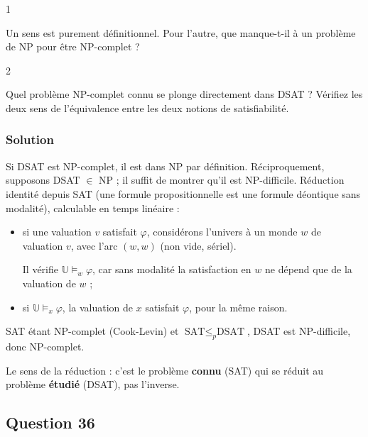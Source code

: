 \documentclass[11pt,a4paper]{article}
\begin{document}
\begin{indication}{1}

Un sens est purement définitionnel. Pour l'autre, que manque-t-il à un problème de NP pour être NP-complet ?

\end{indication}

\begin{indication}{2}

Quel problème NP-complet connu se plonge directement dans DSAT ? Vérifiez les deux sens de l'équivalence entre les deux notions de satisfiabilité.

\end{indication}

\hypertarget{solution-34}{%
\subsubsection{Solution}\label{solution-34}}

Si DSAT est NP-complet, il est dans NP par définition. Réciproquement, supposons DSAT \(\in\) NP ; il suffit de montrer qu'il est NP-difficile. Réduction identité depuis SAT (une formule propositionnelle est une formule déontique sans modalité), calculable en temps linéaire :

\begin{itemize}
\item
  si une valuation \(v\) satisfait \(\varphi\), considérons l'univers à un monde \(w\) de valuation \(v\), avec l'arc \((w,w)\) (non vide, sériel).

  Il vérifie \(\mathbb U\models_w\varphi\), car sans modalité la satisfaction en \(w\) ne dépend que de la valuation de \(w\) ;
\item
  si \(\mathbb U\models_x\varphi\), la valuation de \(x\) satisfait \(\varphi\), pour la même raison.
\end{itemize}

SAT étant NP-complet (Cook-Levin) et \(\text{SAT}\le_p\text{DSAT}\), DSAT est NP-difficile, donc NP-complet.

\begin{piege}

Le sens de la réduction : c'est le problème \textbf{connu} (SAT) qui se réduit au problème \textbf{étudié} (DSAT), pas l'inverse.

\end{piege}

\hypertarget{question-36}{%
\subsection{Question 36}\label{question-36}}
\end{document}
